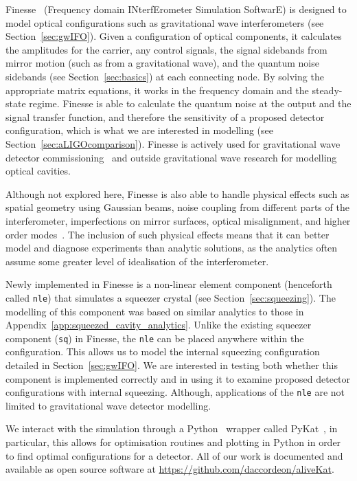 \documentclass[aps,pra,superscriptaddress,reprint,nofootinbib]{revtex4-1}
\newcommand{\code}[1]{\texttt{#1}}
\begin{document}
Finesse~\cite{finesse} (Frequency domain INterfErometer Simulation SoftwarE) is designed to model optical configurations such as gravitational wave interferometers (see Section~\ref{sec:gwIFO}). Given a configuration of optical components, it calculates the amplitudes for the carrier, any control signals, the signal sidebands from mirror motion (such as from a gravitational wave), and the quantum noise sidebands (see Section~\ref{sec:basics}) at each connecting node. By solving the appropriate matrix equations, it works in the frequency domain and the steady-state regime.
Finesse is able to calculate the quantum noise at the output and the signal transfer function, and therefore the sensitivity of a proposed detector configuration, which is what we are interested in modelling (see Section~\ref{sec:aLIGOcomparison}). Finesse is actively used for gravitational wave detector commissioning~\cite{brown2020pykat} and outside gravitational wave research for modelling optical cavities.


Although not explored here, Finesse is also able to handle physical effects such as spatial geometry using Gaussian beams, noise coupling from different parts of the interferometer, imperfections on mirror surfaces, optical misalignment, and higher order modes~\cite{Bond_et_al_2016}. The inclusion of such physical effects means that it can better model and diagnose experiments than analytic solutions, as the analytics often assume some greater level of idealisation of the interferometer.


Newly implemented in Finesse is a non-linear element component (henceforth called \code{nle}) that simulates a squeezer crystal (see Section~\ref{sec:squeezing}). The modelling of this component was based on similar analytics to those in Appendix~\ref{app:squeezed_cavity_analytics}. Unlike the existing squeezer component (\code{sq}) in Finesse, the \code{nle} can be placed anywhere within the configuration. This allows us to model the internal squeezing configuration detailed in Section~\ref{sec:gwIFO}. We are interested in testing both whether this component is implemented correctly and in using it to examine proposed detector configurations with internal squeezing. Although, applications of the \code{nle} are not limited to gravitational wave detector modelling.


We interact with the simulation through a Python~\cite{python} wrapper called PyKat~\cite{brown2020pykat}, in particular, this allows for optimisation routines and plotting in Python in order to find optimal configurations for a detector. All of our work is documented and available as open source software at \url{https://github.com/daccordeon/aliveKat}.
\end{document}
